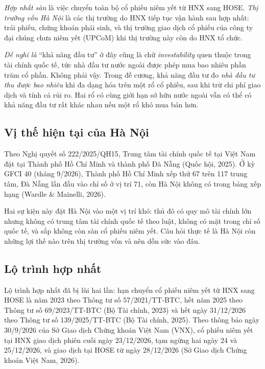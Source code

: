 \emph{Hợp nhất sàn} là việc chuyển toàn bộ cổ phiếu niêm yết từ HNX sang HOSE. \emph{Thị trường vốn Hà Nội} là các thị trường do HNX tiếp tục vận hành sau hợp nhất: trái phiếu, chứng khoán phái sinh, và thị trường giao dịch cổ phiếu của công ty đại chúng chưa niêm yết (UPCoM) khi thị trường này còn do HNX tổ chức.

\begin{delam}
\emph{Dễ nghĩ là} \enquote{khả năng đầu tư} ở đây cũng là chữ \emph{investability} quen thuộc trong tài chính quốc tế, tức nhà đầu tư nước ngoài được phép mua bao nhiêu phần trăm cổ phần. Không phải vậy. Trong đề cương, khả năng đầu tư đo \emph{nhà đầu tư thu được bao nhiêu} khi đa dạng hóa trên một rổ cổ phiếu, sau khi trừ chi phí giao dịch và tính cả rủi ro. Hai rổ có cùng giới hạn sở hữu nước ngoài vẫn có thể có khả năng đầu tư rất khác nhau nếu một rổ khó mua bán hơn.
\end{delam}

\subsection*{Vị thế hiện tại của Hà Nội}

Theo Nghị quyết số 222/2025/QH15, Trung tâm tài chính quốc tế tại Việt Nam đặt tại Thành phố Hồ Chí Minh và thành phố Đà Nẵng (Quốc hội, 2025). Ở kỳ GFCI 40 (tháng 9/2026), Thành phố Hồ Chí Minh xếp thứ 67 trên 117 trung tâm, Đà Nẵng lần đầu vào chỉ số ở vị trí 71, còn Hà Nội không có trong bảng xếp hạng (Wardle \& Mainelli, 2026).

Hai sự kiện này đặt Hà Nội vào một vị trí khó: thủ đô có quy mô tài chính lớn nhưng không có trung tâm tài chính quốc tế theo luật, không có mặt trong chỉ số quốc tế, và sắp không còn sàn cổ phiếu niêm yết. Câu hỏi thực tế là Hà Nội còn những lợi thế nào trên thị trường vốn và nên dồn sức vào đâu.

\subsection*{Lộ trình hợp nhất}

Lộ trình hợp nhất đã bị lùi hai lần: hạn chuyển cổ phiếu niêm yết từ HNX sang HOSE là năm 2023 theo Thông tư số 57/2021/TT-BTC, hết năm 2025 theo Thông tư số 69/2023/TT-BTC (Bộ Tài chính, 2023) và hết ngày 31/12/2026 theo Thông tư số 139/2025/TT-BTC (Bộ Tài chính, 2025). Theo thông báo ngày 30/9/2026 của Sở Giao dịch Chứng khoán Việt Nam (VNX), cổ phiếu niêm yết tại HNX giao dịch phiên cuối ngày 23/12/2026, tạm ngừng hai ngày 24 và 25/12/2026, và giao dịch tại HOSE từ ngày 28/12/2026 (Sở Giao dịch Chứng khoán Việt Nam, 2026).

